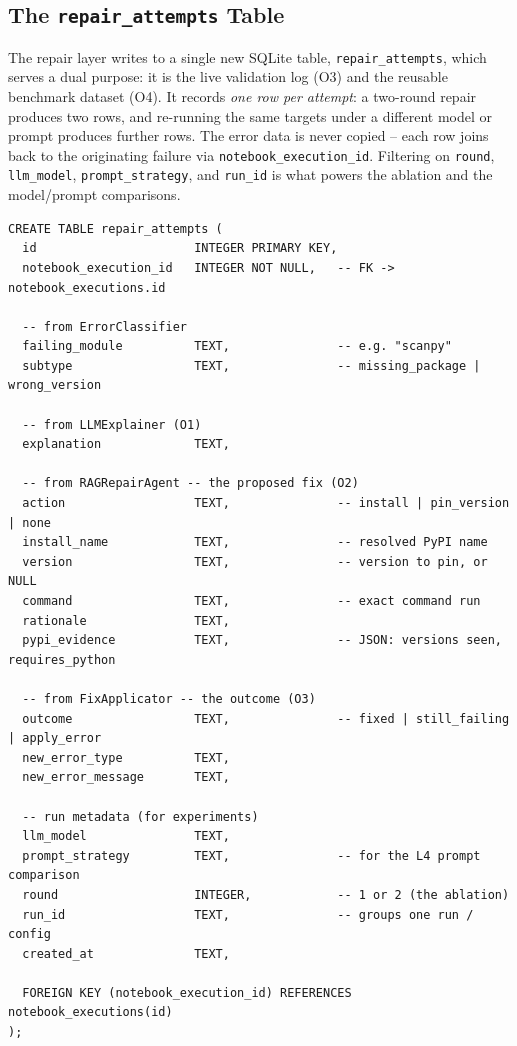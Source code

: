 \subsection{The \texttt{repair\_attempts} Table}
\label{subsec:repair-table}

The repair layer writes to a single new SQLite table,
\texttt{repair\_attempts}, which serves a dual purpose: it is the live
validation log (O3) and the reusable benchmark dataset (O4). It records
\emph{one row per attempt}: a two-round repair produces two rows, and
re-running the same targets under a different model or prompt produces
further rows. The error data is never copied -- each row joins back to the
originating failure via \texttt{notebook\_execution\_id}. Filtering on
\texttt{round}, \texttt{llm\_model}, \texttt{prompt\_strategy}, and
\texttt{run\_id} is what powers the ablation and the model/prompt
comparisons.

\begin{verbatim}
CREATE TABLE repair_attempts (
  id                      INTEGER PRIMARY KEY,
  notebook_execution_id   INTEGER NOT NULL,   -- FK -> notebook_executions.id

  -- from ErrorClassifier
  failing_module          TEXT,               -- e.g. "scanpy"
  subtype                 TEXT,               -- missing_package | wrong_version

  -- from LLMExplainer (O1)
  explanation             TEXT,

  -- from RAGRepairAgent -- the proposed fix (O2)
  action                  TEXT,               -- install | pin_version | none
  install_name            TEXT,               -- resolved PyPI name
  version                 TEXT,               -- version to pin, or NULL
  command                 TEXT,               -- exact command run
  rationale               TEXT,
  pypi_evidence           TEXT,               -- JSON: versions seen, requires_python

  -- from FixApplicator -- the outcome (O3)
  outcome                 TEXT,               -- fixed | still_failing | apply_error
  new_error_type          TEXT,
  new_error_message       TEXT,

  -- run metadata (for experiments)
  llm_model               TEXT,
  prompt_strategy         TEXT,               -- for the L4 prompt comparison
  round                   INTEGER,            -- 1 or 2 (the ablation)
  run_id                  TEXT,               -- groups one run / config
  created_at              TEXT,

  FOREIGN KEY (notebook_execution_id) REFERENCES notebook_executions(id)
);
\end{verbatim}

